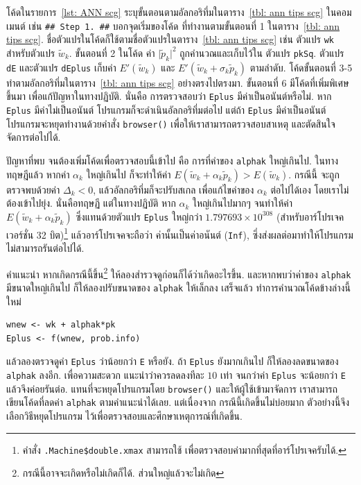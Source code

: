 โค้ดในรายการ~\ref{lst: ANN scg} ระบุขั้นตอนตามอัลกอริทึ่มในตาราง~\ref{tbl: ann tips scg} ในคอมเมนต์ เช่น \texttt{\#\# Step 1. \#\#} บอกจุดเริ่มของโค้ด ที่ทำงานตามขั้นตอนที่ 1 ในตาราง~\ref{tbl: ann tips scg}.
ชื่อตัวแปรในโค้ดก็ใช้ตามชื่อตัวแปรในตาราง~\ref{tbl: ann tips scg} เช่น ตัวแปร \texttt{wk} สำหรับตัวแปร $\tilde{w}_k$.
ขั้นตอนที่ 2 ในโค้ด ค่า $\vert \tilde{p}_k \vert^2$ ถูกคำนวณและเก็บไว้ใน ตัวแปร \texttt{pkSq}.
ตัวแปร \texttt{dE} และตัวแปร \texttt{dEplus} เก็บค่า $E'(\tilde{w}_k)$ และ $E'(\tilde{w}_k + \sigma_k \tilde{p}_k)$ ตามลำดับ.
โค้ดขั้นตอนที่ 3-5 ทำตามอัลกอริทึ่มในตาราง~\ref{tbl: ann tips scg} อย่างตรงไปตรงมา.
ขั้นตอนที่ 6 มีโค้ดที่เพิ่มพิเศษขึ้นมา เพื่อแก้ปัญหาในทางปฏิบัติ.
นั่นคือ การตรวจสอบว่า \texttt{Eplus} มีค่าเป็นอนันต์หรือไม่.
หาก \texttt{Eplus} มีค่าไม่เป็นอนันต์ โปรแกรมก็จะดำเนินอัลกอริทึ่มต่อไป
แต่ถ้า \texttt{Eplus} มีค่าเป็นอนันต์ โปรแกรมจะหยุดทำงานด้วยคำสั่ง \texttt{browser()}
เพื่อให้เราสามารถตรวจสอบสาเหตุ และตัดสินใจจัดการต่อไปได้.

ปัญหาที่พบ จนต้องเพิ่มโค้ดเพื่อตรวจสอบนี้เข้าไป คือ การที่ค่าของ \texttt{alphak} ใหญ่เกินไป.
ในทางทฤษฎีแล้ว หากค่า $\alpha_k$ ใหญ่เกินไป ก็จะทำให้ค่า $E(\tilde{w}_k + \alpha_k \tilde{p}_k) > E(\tilde{w}_k)$.
กรณีนี้ จะถูกตรวจพบด้วยค่า $\Delta_k < 0$, 
แล้วอัลกอริทึ่มก็จะปรับสเกล เพื่อแก้ไขค่าของ $\alpha_k$ ต่อไปได้เอง โดยเราไม่ต้องเข้าไปยุ่ง.
นั่นคือทฤษฏี แต่ในทางปฏิบัติ หาก $\alpha_k$ ใหญ่เกินไปมากๆ จนทำให้ค่า $E(\tilde{w}_k + \alpha_k \tilde{p}_k)$ ซึ่งแทนด้วยตัวแปร \texttt{Eplus} ใหญ่กว่า $1.797693 \times 10^{308}$ (สำหรับอาร์โปรเจค เวอร์ชั่น 32 บิต)\footnote{%
คำสั่ง \texttt{.Machine\$double.xmax} สามารถใช้ เพื่อตรวจสอบค่ามากที่สุดที่อาร์โปรเจครับได้.} แล้วอาร์โปรเจคจะถือว่า ค่านั้นเป็นค่าอนันต์ (\texttt{Inf}), ซึ่งส่งผลต่อมาทำให้โปรแกรมไม่สามารถรันต่อไปได้.

คำแนะนำ หากเกิดกรณีนี้ขึ้น\footnote{%
กรณีนี้อาจจะเกิดหรือไม่เกิดก็ได้. ส่วนใหญ่แล้วจะไม่เกิด}  ให้ลองสำรวจดูก่อนก็ได้ว่าเกิดอะไรขึ้น.
และหากพบว่าค่าของ \texttt{alphak} มีขนาดใหญ่เกินไป ก็ให้ลองปรับขนาดของ \texttt{alphak} ให้เล็กลง
เสร็จแล้ว ทำการคำนวณโค้ดข้างล่างนี้ใหม่
\begin{verbatim}
wnew <- wk + alphak*pk
Eplus <- f(wnew, prob.info)
\end{verbatim}
 
แล้วลองตรวจดูค่า \texttt{Eplus} ว่าน้อยกว่า \texttt{E} หรือยัง.
ถ้า \texttt{Eplus} ยังมากเกินไป ก็ให้ลองลดขนาดของ \texttt{alphak} ลงอีก.
เพื่อความสะดวก แนะนำว่าควรลดลงทีละ $10$ เท่า จนกว่าค่า \texttt{Eplus} จะน้อยกว่า \texttt{E} แล้วจึงค่อยรันต่อ.
แทนที่จะหยุดโปรแกรมโดย \texttt{browser()} และให้ผู้ใช้เข้ามาจัดการ
เราสามารถเขียนโค้ดที่ลดค่า \texttt{alphak} ตามคำแนะนำได้เลย.
แต่เนื่องจาก กรณีนี้เกิดขึ้นไม่บ่อยมาก ตัวอย่างนี้จึงเลือกวิธีหยุดโปรแกรม ไว้เพื่อตรวจสอบและศึกษาเหตุการณ์ที่เกิดขึ้น.

